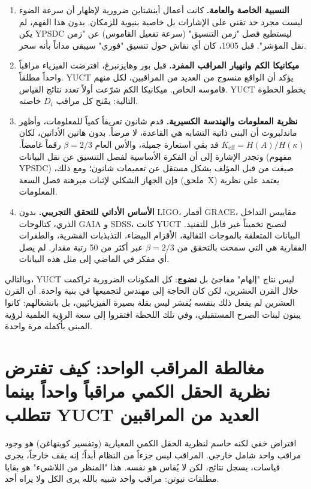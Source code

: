\documentclass[12pt,a4paper]{article}
\begin{document}
	\begin{enumerate}[leftmargin=*, label=\textbf{\arabic*.}]
		\item \textbf{النسبية الخاصة والعامة.} كانت أعمال أينشتاين ضرورية لإظهار أن سرعة الضوء ليست مجرد حد تقني على الإشارات بل خاصية بنيوية للزمكان. بدون هذا الفهم، لم يكن YPSDC ليستطيع فصل "زمن التنسيق" (سرعة تفعيل القاموس) عن "زمن نقل المؤشر". قبل 1905، كان أي نقاش حول تنسيق "فوري" سيبقى مداناً بأنه سحر.
		\item \textbf{ميكانيكا الكم وانهيار المراقب المفرد.} قبل بور وهايزنبرغ، افترضت الفيزياء مراقباً واحداً مطلقاً. YUCT يؤكد أن الواقع منسوج من العديد من المراقبين، لكل منهم قاموسه الخاص. ميكانيكا الكم شرّعت أولاً تعدد نتائج القياس. YUCT يخطو الخطوة التالية: يمْنح كل مراقب \(D_i\) خاصته.
		\item \textbf{نظرية المعلومات والهندسة الكسيرية.} قدم شانون تعريفاً كمياً للمعلومات، وأظهر ماندلبروت أن البنى ذاتية التشابه هي القاعدة، لا مرضاً. بدون هاتين الأداتين، لكان \(K_{\mathrm{eff}} = H(A)/H(\kappa)\) قد بقي استعارة جميلة، والأس العام \(\beta=2/3\) رقماً غامضاً. وتجدر الإشارة إلى أن الفكرة الأساسية لفصل التنسيق عن نقل البيانات (مفهوم YPSDC) صيغت من قبل المؤلف بشكل مستقل عن تعميمات شانون؛ ومع ذلك، فإن الجهاز الشكلي لإثبات مبرهنة فصل السعة (ملحق~X) يعتمد على نظرية المعلومات.
		\item \textbf{الأساس الأداتي للتحقق التجريبي.} بدون LIGO، أقمار GRACE، مقاييس التداخل الذري، كتالوجات GAIA و SDSS، كانت YUCT لتصبح تخميناً غير قابل للتفنيد. البيانات المتعلقة بالموجات الثقالية، الأقزام البيضاء، التذبذبات القشرية، والطفرات الفقارية هي التي سمحت بالتحقق من \(\beta=2/3\) عبر أكثر من 50 رتبة مقدار. لم يصل أي مفكر في الماضي إلى مثل هذه البيانات.
	\end{enumerate}
	
	وبالتالي، YUCT ليس نتاج "إلهام" مفاجئ بل \textbf{نضوج}: كل المكونات الضرورية تراكمت خلال القرن العشرين، لكن كان الحاجة إلى مهندس لتجميعها في بنية واحدة. أن القرن العشرين لم يفعل ذلك بنفسه يُفسَر ليس بقلة بصيرة الفيزيائيين، بل بانشغالهم: كانوا يبنون لبنات الصرح المستقبلي، وفي تلك اللحظة افتقروا إلى سعة الرؤية العلمية لرؤية المبنى بأكمله مرة واحدة.
	
	\section{مغالطة المراقب الواحد: كيف تفترض نظرية الحقل الكمي مراقباً واحداً بينما تتطلب YUCT العديد من المراقبين}
	
	افتراض خفي لكنه حاسم لنظرية الحقل الكمي المعيارية (وتفسير كوبنهاغن) هو وجود مراقب واحد شامل خارجي. المراقب ليس جزءاً من النظام أبداً؛ إنه يقف خارجاً، يجري قياسات، يسجل نتائج، لكن لا يُقاس هو نفسه. هذا "المنظر من اللاشيء" هو بقايا مطلقات نيوتن: مراقب واحد شبيه بالله يرى الكل ولا يراه أحد.
	
\end{document}

